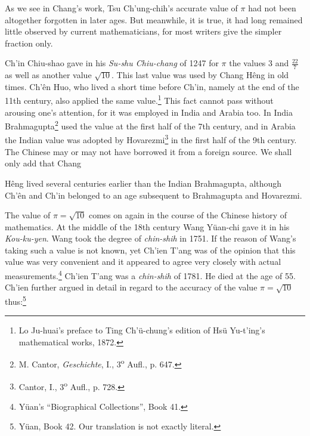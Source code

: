 \documentclass[11pt]{article}
\newcommand{\scanpage}[2]{\clearpage\setcounter{footnote}{0}\noindent{\footnotesize\color{gray}PDF page #1 · #2}\par\medskip}
\newcommand{\scanfooter}{}
\begin{document}
As we see in Chang's work, Tsu Ch'ung-chih's accurate value of $\pi$ had not been altogether forgotten in later ages. But meanwhile, it is true, it had long remained little observed by current mathematicians, for most writers give the simpler fraction only.

Ch'in Chiu-shao gave in his \emph{Su-shu Chiu-chang} of 1247 for $\pi$ the values 3 and $\frac{22}{7}$ as well as another value $\sqrt{10}$. This last value was used by Chang Hêng in old times. Ch'ên Huo, who lived a short time before Ch'in, namely at the end of the 11th century, also applied the same value.\footnote{Lo Ju-huai's preface to Ting Ch'ü-chung's edition of Hsü Yu-t'ing's mathematical works, 1872.} This fact cannot pass without arousing one's attention, for it was employed in India and Arabia too. In India Brahmagupta\footnote{M. Cantor, \emph{Geschichte}, I., 3\textsuperscript{o} Aufl., p. 647.} used the value at the first half of the 7th century, and in Arabia the Indian value was adopted by Hovarezmi\footnote{Cantor, I., 3\textsuperscript{o} Aufl., p. 728.} in the first half of the 9th century. The Chinese may or may not have borrowed it from a foreign source. We shall only add that Chang
\scanfooter

\scanpage{0151}{Chapter 20, printed page 137}
Hêng lived several centuries earlier than the Indian Brahmagupta, although Ch'ên and Ch'in belonged to an age subsequent to Brahmagupta and Hovarezmi.

The value of $\pi=\sqrt{10}$ comes on again in the course of the Chinese history of mathematics. At the middle of the 18th century Wang Yüan-chi gave it in his \emph{Kou-ku-yen}. Wang took the degree of \emph{chin-shih} in 1751. If the reason of Wang's taking such a value is not known, yet Ch'ien T'ang was of the opinion that this value was very convenient and it appeared to agree very closely with actual measurements.\footnote{Yüan's ``Biographical Collections'', Book 41.} Ch'ien T'ang was a \emph{chin-shih} of 1781. He died at the age of 55. Ch'ien further argued in detail in regard to the accuracy of the value $\pi=\sqrt{10}$ thus:\footnote{Yüan, Book 42. Our translation is not exactly literal.}
\end{document}
